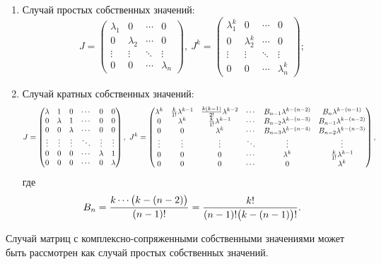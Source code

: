 	\begin{enumerate}
		\item Случай простых собственных значений:
		\[ 
			J = \begin{pmatrix} 
				\lambda_1 & 0 & \cdots & 0 \\ 
				0 & \lambda_2 & \cdots & 0 \\ 
				\vdots & \vdots & \ddots & \vdots \\ 
				0 & 0 & \cdots & \lambda_n 
			\end{pmatrix}, ~ 
			J^k = \begin{pmatrix} 
				\lambda_1^k & 0 & \cdots & 0 \\ 
				0 & \lambda_2^k & \cdots & 0 \\ 
				\vdots & \vdots & \ddots & \vdots \\ 
				0 & 0 & \cdots & \lambda_n^k 
			\end{pmatrix};
		\]
		\item Случай кратных собственных значений:
		\[ 
			J = \begin{pmatrix} 
				\lambda & 1 & 0 & \cdots & 0 & 0 \\ 
				0 & \lambda & 1 & \cdots & 0 & 0 \\ 
				0 & 0 & \lambda & \cdots & 0 & 0 \\ 
				\vdots & \vdots & \vdots & \ddots & \vdots & \vdots \\ 
				0 & 0 & 0 & \cdots & \lambda & 1 \\ 
				0 & 0 & 0 & \cdots & 0 & \lambda \\ 
			\end{pmatrix}, ~ 
			J^k = \begin{pmatrix} 
				\lambda^k & \frac{k}{1!} \lambda^{k-1} & \frac{k\left( k-1 \right)}{2!} \lambda^{k-2} & \cdots & B_{n-1} \lambda^{k-(n-2)} &  B_n \lambda^{k-(n-1)} \\ 
				0 & \lambda^k & \frac{k}{1!} \lambda^{k-1} & \cdots & B_{n-2} \lambda^{k-(n-3)} & B_{n-1} \lambda^{k-(n-2)} \\ 
				0 & 0 & \lambda^k & \cdots & B_{n-3} \lambda^{k-(n-4)} & B_{n-2} \lambda^{k-(n-3)} \\ 
				\vdots & \vdots & \vdots & \ddots & \vdots & \vdots \\ 
				0 & 0 & 0 & \cdots & \lambda^k & \frac{k}{1!} \lambda^{k-1} \\ 
				0 & 0 & 0 & \cdots & 0 & \lambda^k \\ 
			\end{pmatrix}, ~ 
		\]
		где
		\[ B_{n} = \frac{k \cdots \bigl( k-(n-2) \bigr)}{(n-1)!} = \frac{k!}{(n-1)! \bigl( k-(n-1) \bigr)!}. \]

	\end{enumerate}
	Случай матриц с комплексно-сопряженными собственными значениями может быть рассмотрен как случай простых собственных значений.

